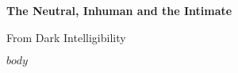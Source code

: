 \documentclass[10pt,a4paper]{article}
\begin{document}
\begin{center}
{\Huge\bfseries\color{darkgray}The Neutral, Inhuman and the Intimate}
\vspace{0.5em}

{\large\color{lightgray}From Dark Intelligibility}
\end{center}

\vspace{2em}

$body$

\newpage
\theendnotes
\end{document}
